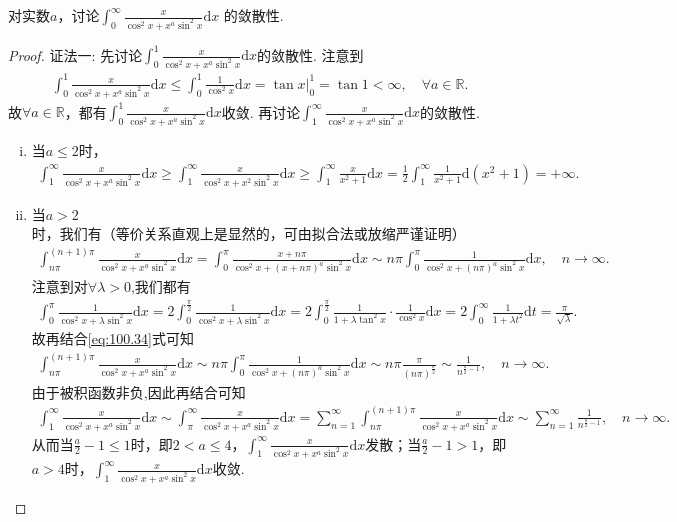 \documentclass[../../main.tex]{subfiles}
\begin{document}
\begin{example}
对实数\(a\)，讨论$\int_{0}^{\infty}\frac{x}{\cos^{2}x + x^{a}\sin^{2}x}\mathrm{d}x$
的敛散性. 
\end{example}
\begin{proof}
{\color{blue}证法一:}
先讨论$\int_0^1\frac{x}{\cos^2x+x^a\sin^2x}\mathrm{d}x$的敛散性. 注意到
\begin{align*}
\int_0^1\frac{x}{\cos^2x+x^a\sin^2x}\mathrm{d}x\leqslant \int_0^1\frac{1}{\cos^2x}\mathrm{d}x=\tan x \Big |_{0}^{1}=\tan 1<\infty,\quad \forall a\in \mathbb{R}.
\end{align*}
故$\forall a\in \mathbb{R}$，都有$\int_0^1\frac{x}{\cos^2x+x^a\sin^2x}\mathrm{d}x$收敛.
再讨论$\int_1^{\infty}\frac{x}{\cos^2x+x^a\sin^2x}\mathrm{d}x$的敛散性.
\begin{enumerate}[(i)]
\item 当$a\leqslant 2$时，
\begin{align*}
\int_1^{\infty}\frac{x}{\cos^2x+x^a\sin^2x}\mathrm{d}x\geqslant \int_1^{\infty}\frac{x}{\cos^2x+x^2\sin^2x}\mathrm{d}x\geqslant \int_1^{\infty}\frac{x}{x^2+1}\mathrm{d}x=\frac{1}{2}\int_1^{\infty}\frac{1}{x^2+1}\mathrm{d}(x^2+1)=+\infty.
\end{align*}
\item 当$a>2$时，我们有（等价关系直观上是显然的，可由拟合法或放缩严谨证明）
\begin{align}
\int_{n\pi}^{(n+1)\pi}\frac{x}{\cos^2x+x^a\sin^2x}\mathrm{d}x=\int_0^{\pi}\frac{x+n\pi}{\cos^2x+(x+n\pi)^a\sin^2x}\mathrm{d}x\sim n\pi \int_0^{\pi}\frac{1}{\cos^2x+(n\pi)^a\sin^2x}\mathrm{d}x,\quad n\rightarrow \infty.\label{eq:100.34}
\end{align}
注意到对$\forall \lambda >0$,我们都有
\begin{align*}
\int_0^{\pi}\frac{1}{\cos^2x+\lambda \sin^2x}\mathrm{d}x=2\int_0^{\frac{\pi}{2}}\frac{1}{\cos^2x+\lambda \sin^2x}\mathrm{d}x=2\int_0^{\frac{\pi}{2}}\frac{1}{1+\lambda \tan^2x}\cdot \frac{1}{\cos^2x}\mathrm{d}x=2\int_0^{\infty}\frac{1}{1+\lambda t^2}\mathrm{d}t=\frac{\pi}{\sqrt{\lambda}}.
\end{align*}
故再结合\eqref{eq:100.34}式可知
\begin{align*}
\int_{n\pi}^{(n+1)\pi}\frac{x}{\cos^2x+x^a\sin^2x}\mathrm{d}x\sim n\pi \int_0^{\pi}\frac{1}{\cos^2x+(n\pi)^a\sin^2x}\mathrm{d}x\sim n\pi \frac{\pi}{(n\pi)^{\frac{a}{2}}}\sim \frac{1}{n^{\frac{a}{2}-1}},\quad n\rightarrow \infty.
\end{align*}
由于被积函数非负,因此再结合可知
\begin{align*}
\int_1^{\infty}\frac{x}{\cos^2x+x^a\sin^2x}\mathrm{d}x\sim \int_{\pi}^{\infty}\frac{x}{\cos^2x+x^a\sin^2x}\mathrm{d}x=\sum_{n=1}^{\infty}\int_{n\pi}^{(n+1)\pi}\frac{x}{\cos^2x+x^a\sin^2x}\mathrm{d}x\sim \sum_{n=1}^{\infty}\frac{1}{n^{\frac{a}{2}-1}},\quad n\rightarrow \infty.
\end{align*}
从而当$\frac{a}{2}-1\leqslant 1$时，即$2<a\leqslant 4$，$\int_1^{\infty}\frac{x}{\cos^2x+x^a\sin^2x}\mathrm{d}x$发散；当$\frac{a}{2}-1>1$，即$a>4$时，$\int_1^{\infty}\frac{x}{\cos^2x+x^a\sin^2x}\mathrm{d}x$收敛.
\end{enumerate}


\end{proof}
\end{document}
